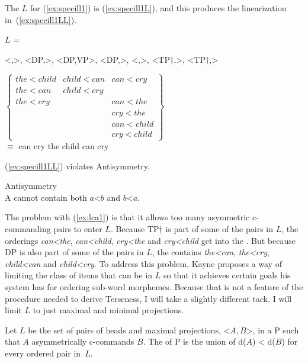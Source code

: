 \documentclass[output=paper]{langsci/langscibook}
\begin{document}
The $L$ for (\ref{ex:specill1}) is (\ref{ex:specill1L}), and this produces the
linearization in~(\ref{ex:specill1LL}).

\begin{exe}
	\ex \label{ex:sill1}
	\begin{xlist}
		\ex \label{ex:specill1L} $L$ = \parbox[t]{4in}{<,>, <DP,>, <DP,VP>, <DP,>, <,>, <TP$\dag$,>, <TP$\dag$,>}
		\medskip
		\ex \label{ex:specill1LL}
		$\left\{
			\begin{array}{lll}
				the < child	&	child < can & can < cry\\
				the < can		&	child < cry\\
				the < cry		&							& can < the\\
										&							& cry < the\\
										&							& can < child\\
										&							& cry < child
			\end{array}
		\right\}$\\[5pt]
		$\equiv$ can cry the child can cry
	\end{xlist}
\end{exe}

(\ref{ex:specill1LL}) violates Antisymmetry.
\begin{exe}
	\ex \label{ex:antisymmb} Antisymmetry\\
	A  cannot contain both $a$<$b$ and $b$<$a$.
\end{exe}

The problem with (\ref{ex:lca1}) is that it allows too many asymmetric
c-commanding pairs to enter $L$. Because TP$\dag$ is part of some of the pairs
in $L$, the orderings \emph{can<the}, \emph{can<child}, \emph{cry<the} and
\emph{cry<child} get into the . But because DP is also part of
some of the pairs in $L$, the  contains \emph{the<can},
\emph{the<cry}, \emph{child<can} and \emph{child<cry}. To address this problem,
Kayne proposes a way of limiting the class of items that can be in $L$ so that
it achieves certain goals his system has for ordering sub-word morphemes.
Because that is not a feature of the procedure needed to derive Terseness, I
will take a slightly different tack. I will limit $L$ to just maximal and
minimal projections.
\begin{exe}
	\ex \label{ex:lca2}
	\begin{xlist}
		\ex Let $L$ be the set of pairs of heads and maximal projections, <$A,B$>, in a  P such that $A$ asymmetrically c-commands $B$.
		\ex The  of P is the union of d($A$) < d($B$) for every ordered pair in~$L$.
	\end{xlist}
\end{exe}
\end{document}
